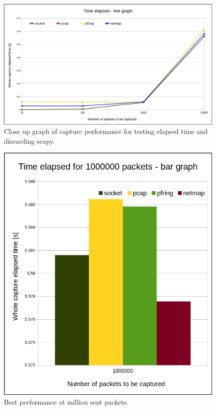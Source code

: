 \documentclass[12pt,a4paper,twoside]{book}
\begin{document}
                \begin{figure}[h]
                    \centering
                    \includegraphics[scale=0.39]{closeup_speed_line-graph}
                    \caption{Close up graph of capture performance for testing elapsed time and discarding scapy.}
                    \label{figure:tests:closetimed}
                \end{figure}
                \begin{figure}[h]
                    \centering
                    \includegraphics[scale=0.4]{speed_bar-graph}
                    \caption{Best performance at million sent packets.}
                    \label{figure:tests:timed:best}
                \end{figure}
\end{document}
